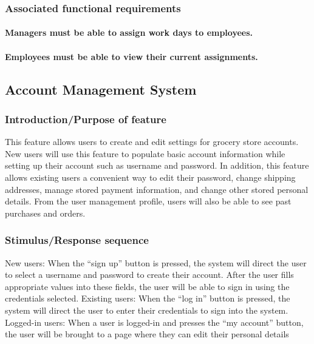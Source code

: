 \documentclass{scrreprt}
\theoremstyle{funreq}
\begin{document}
	\subsubsection{Associated functional requirements}
	\paragraph[]{\normalfont Managers must be able to assign work days to employees.}
	\paragraph[]{\normalfont Employees must be able to view their current assignments.}
	
	\subsection{Account Management System}
	\subsubsection{Introduction/Purpose of feature}
	This feature allows users to create and edit settings for grocery store accounts.  New users will use this feature to populate basic account information while setting up their account such as username and password.  In addition, this feature allows existing users a convenient way to edit their password, change shipping addresses, manage stored payment information, and change other stored personal details.  From the user management profile, users will also be able to see past purchases and orders.
	
	\subsubsection{Stimulus/Response sequence}
	\indent New users: When the “sign up” button is pressed, the system will direct the user to select a username and password to create their account.  After the user fills appropriate values into these fields, the user will be able to sign in using the credentials selected.
	Existing users: When the “log in” button is pressed, the system will direct the user to enter their credentials to sign into the system.  
	Logged-in users: When a user is logged-in and presses the “my account” button, the user will be brought to a page where they can edit their personal details
	
\end{document}
